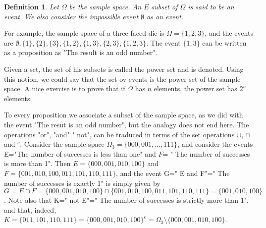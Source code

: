 \documentclass[12pt]{article}
\newtheorem{definition}[theorem]{Definition}
\newcommand{\<}{{\langle \!\! \langle}}
\renewcommand{\>}{{\rangle \!\! \rangle}}
\newcommand{\commento}[1]{
	\par\noindent
	\colorbox{light}{\begin{minipage}{120 mm}#1\end{minipage}}
	\par\noindent
}
\begin{document}
\begin{definition}
Let $\Omega$ be the sample space. An $E$ subset of $\Omega$ is said to be an event. We also consider the impossible event $\emptyset$ as an event.   
\end{definition}


For example, the sample space of a three faced die is $\Omega = \{1,2,3\}$, and the events are $\emptyset, \{1\}, \{2\}, \{3\}, \{1,2\}, \{1,3\}, \{2,3\}, \{1,2,3\}$. The event $\{1,3\}$ can be written as a proposition as "The result is an odd number".
\commento{ Given a set, the set of his subsets is called the power set and is denoted. Using this notion, we could say that the set ov events is the power set of the sample space. A nice exercise is to prove that if $\Omega$ has $n$ elements, the power set has $2^n$ elements.}
 
To every proposition we associate a subset of the sample space, as we did with the event "The resut is an odd number", but the analogy does not end here. The operations "or", "and" " not", can be traduced in terms of the set operations $\cup$, $\cap$ and $^c$. Consider the sample space $\Omega_3=\{000,001,...,111\}$, and consider the events E="The number of successes is less than one" and $F$= " The number of successes is more than 1". Then $E=\{000,001,010,100\}$ and $F = \{001,010,100,011,101,110,111\}$, and the event G=" E and F"=" The number of successes is exactly 1" is simply given by $G=E\cap F= \{000,001,010,100\}\cap \{001,010,100,011,101,110,111\}=\{001,010,100\}$. Note also that K=" not E"=" The number of successes is strictly more than 1", and that, indeed, $K=\{011,101,110,111\}=\{000,001,010,100\}^c=\Omega_3\setminus \{000,001,010,100\}$.     

\end{document}
